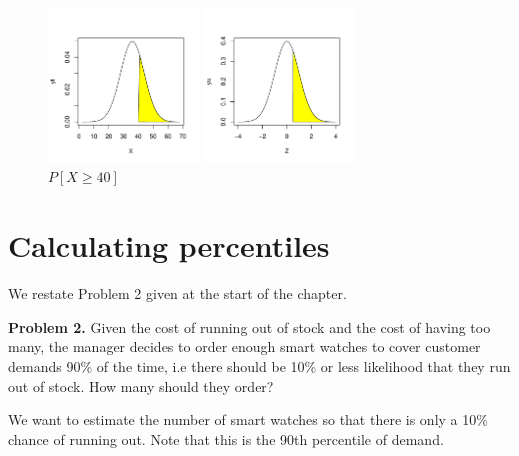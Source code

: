 \documentclass[11pt, chapterprefix=true]{scrbook}\usepackage[]{graphicx}\usepackage[]{color}
\begin{document}
\begin{figure}[ht]

\caption{$P[ X \ge 40 ]$ }

\begin{minipage}[ht]{7cm}



{\centering \includegraphics[width=4cm]{figure/LBL4d1-1} 

}



\end{minipage}
\begin{minipage}[ht]{7cm}


{\centering \includegraphics[width=4cm]{figure/LBL4d2-1} 

}




\end{minipage}
\end{figure}

\section{Calculating percentiles}

We restate Problem 2 given at the start of the chapter.

\textbf{Problem 2.} Given the cost of running out of stock and the cost of having too many, the manager decides to order enough smart watches to cover customer demands 90\% of the time, i.e there should be 10\% or less likelihood that they run out of stock.  How many should they order?

We want to estimate the number of smart watches so that there is only a 10\% chance of running out.  Note that this is the 90th percentile of demand.
\end{document}
